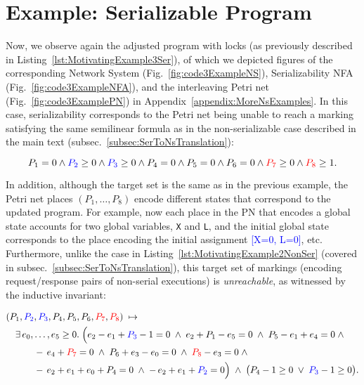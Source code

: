 
\section{Example: Serializable Program}
\label{appendix:ns-serializable}


Now, we observe again the adjusted program with locks (as previously described in Listing~\ref{lst:MotivatingExample3Ser}), of which we depicted figures of the corresponding Network System (Fig.~\ref{fig:code3ExampleNS}), Serializability NFA (Fig.~\ref{fig:code3ExampleNFA}), and the interleaving Petri net (Fig.~\ref{fig:code3ExamplePN}) in Appendix~\ref{appendix:MoreNsExamples}.
%
In this case, serializability corresponds to the Petri net being unable to reach a marking satisfying the same semilinear formula as in the non-serializable case described in the main text (subsec.~\ref{subsec:SerToNsTranslation}):

\[
P_1 = 0 \wedge 
\textcolor{blue}{P_2} \ge 0 \wedge \textcolor{blue}{P_3} \ge 0  \wedge P_4 = 0
\wedge P_5 = 0 \wedge P_6 = 0 \wedge \textcolor{red}{P_7} \ge 0 \wedge \textcolor{red}{P_8} \ge 1.
\]

%


In addition, although the target set is the same as in the previous example, the Petri net places $(P_1,\ldots,P_8)$ encode different states that correspond to the updated program. For example, now each place in the PN that encodes a global state accounts for two global variables, \texttt{X} and \texttt{L}, and the initial global state corresponds to the place encoding the initial assignment \textcolor{blue}{[X=0, L=0]}, etc.
%
Furthermore, unlike the case in Listing~\ref{lst:MotivatingExample2NonSer} (covered in subsec.~\ref{subsec:SerToNsTranslation}), this target set of markings (encoding request/response pairs of non-serial executions) is \textit{unreachable}, as witnessed by the inductive invariant:


\[
\begin{aligned}
	&(P_{1},\textcolor{blue}{P_{2}},\textcolor{blue}{P_{3}},P_{4},P_{5},P_{6},\textcolor{red}{P_{7}},\textcolor{red}{P_{8}})
	\;\mapsto\;\\
	&\quad
	\exists\,e_{0},\dots,e_{5}\ge0.\;
	\Bigl(
	e_{2}-e_{1}+\textcolor{blue}{P_{3}}-1=0\;\land\;
	e_{2}+P_{1}-e_{5}=0\;\land\;
	P_{5}-e_{1}+e_{4}=0\;\land\\
	&\qquad\quad
	-\,e_{4}+\textcolor{red}{P_{7}}=0\;\land\;
	P_{6}+e_{3}-e_{0}=0\;\land\;
	\textcolor{red}{P_{8}}-e_{3}=0\;\land\\
	&\qquad\quad
	-\,e_{2}+e_{1}+e_{0}+P_{4}=0\;\land\;
	-\,e_{2}+e_{1}+\textcolor{blue}{P_{2}}=0
	\Bigr)
	\;\land\;
	\bigl(P_{4}-1\ge0\;\lor\;\textcolor{blue}{P_{3}}-1\ge0\bigr).
\end{aligned}
\]


